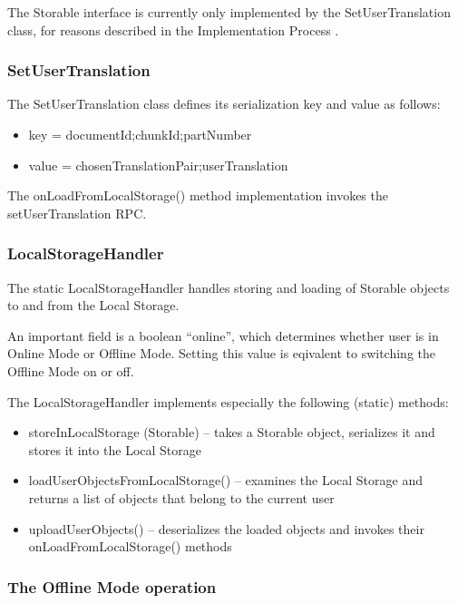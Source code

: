 The Storable interface is currently only implemented by the SetUserTranslation class, for reasons described in the Implementation Process .

\subsubsection{SetUserTranslation}

The SetUserTranslation class defines its serialization key and value as follows:

\begin{itemize}
\item key = documentId;chunkId;partNumber
\item value = chosenTranslationPair;userTranslation
\end{itemize}

The onLoadFromLocalStorage() method implementation invokes the setUserTranslation RPC.

\subsubsection{LocalStorageHandler}

The static LocalStorageHandler handles storing and loading of Storable objects to and from the Local Storage.

An important field is a boolean ``online'', which determines whether user is in Online Mode or Offline Mode. Setting this value is eqivalent to switching the Offline Mode on or off.

The LocalStorageHandler implements especially the following (static) methods:

\begin{itemize}
\item storeInLocalStorage (Storable) -- takes a Storable object, serializes it and stores it into the Local Storage

\item loadUserObjectsFromLocalStorage() -- examines the Local Storage and returns a list of objects that belong to the current user

\item uploadUserObjects() -- deserializes the loaded objects and invokes their onLoadFromLocalStorage() methods
\end{itemize}

\subsubsection{The Offline Mode operation}

